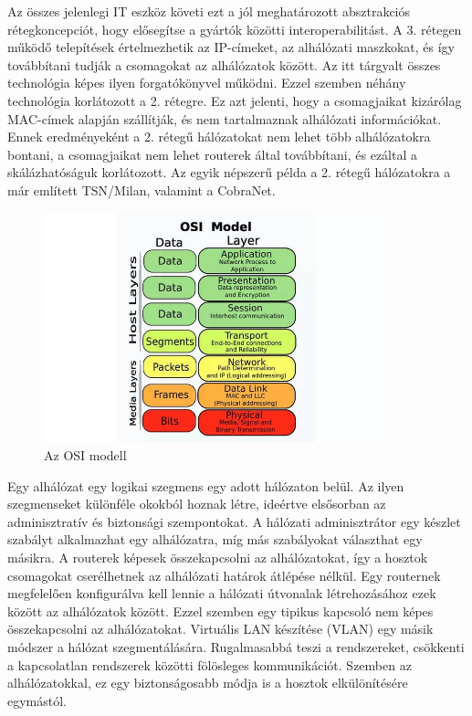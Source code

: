 Az összes jelenlegi IT eszköz követi ezt a jól
meghatározott absztrakciós rétegkoncepciót, hogy elősegítse a gyártók közötti
interoperabilitást. A 3. rétegen működő telepítések értelmezhetik az IP-címeket,
az alhálózati maszkokat, és így továbbítani tudják a csomagokat az
alhálózatok között. Az itt tárgyalt összes technológia képes ilyen
forgatókönyvel működni. Ezzel szemben néhány technológia korlátozott a 2.
rétegre. Ez azt jelenti, hogy a csomagjaikat kizárólag MAC-címek alapján
szállítják, és nem tartalmaznak alhálózati információkat. Ennek eredményeként a
2. rétegű hálózatokat nem lehet több alhálózatokra bontani, a csomagjaikat nem
lehet routerek által továbbítani, és ezáltal a skálázhatóságuk korlátozott. 
Az egyik népszerű példa a 2. rétegű hálózatokra a már említett TSN/Milan, valamint a CobraNet.
\begin{figure}[H]
	\centering
	\includegraphics[width=100mm, keepaspectratio]{figures/osi_modell.jpg}
	\caption{Az OSI modell}
	\label {fig:osi_modell}
\end{figure}
Egy alhálózat egy logikai szegmens egy adott hálózaton belül. Az ilyen szegmenseket
különféle okokból hoznak létre, ideértve elsősorban az adminisztratív és biztonsági
szempontokat. A hálózati adminisztrátor egy készlet szabályt alkalmazhat egy
alhálózatra, míg más szabályokat választhat egy másikra. A routerek képesek
összekapcsolni az alhálózatokat, így a hosztok csomagokat cserélhetnek az
alhálózati határok átlépése nélkül. Egy routernek megfelelően konfigurálva kell
lennie a hálózati útvonalak létrehozásához ezek között az alhálózatok között.
Ezzel szemben egy tipikus kapcsoló nem képes összekapcsolni az alhálózatokat.
Virtuális LAN készítése (VLAN) egy másik módszer a hálózat szegmentálására. 
Rugalmasabbá teszi a rendszereket, csökkenti a kapcsolatlan rendszerek közötti fölösleges kommunikációt.
Szemben az alhálózatokkal, ez egy biztonságosabb módja is a hosztok elkülönítésére egymástól.
